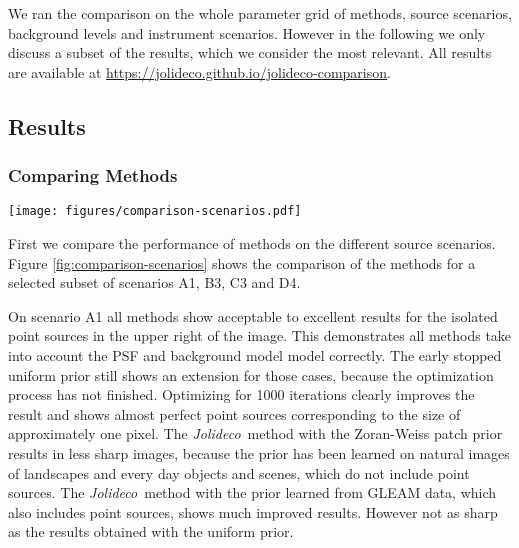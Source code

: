 \documentclass[twocolumn]{aastex631}
\newcommand{\jolideco}{\textit{Jolideco}~}
\newcommand{\todo}[1]{\textcolor{red}{TODO: #1}\PackageWarning{TODO:}{#1!}}
\begin{document}
    We ran the comparison on the whole parameter grid of methods, source scenarios, background levels and instrument scenarios. However in the following we only discuss a subset of the results, which we consider the most relevant. All results are available at \url{https://jolideco.github.io/jolideco-comparison}.

    \subsection{Results}
    \subsubsection{Comparing Methods}
    \begin{figure*}
        \begin{centering}
            \texttt{[image: figures/comparison-scenarios.pdf]}
            \caption{
                Comparison of different deconvolution methods for different selected scenarios, as described in Section~\ref{subsec:test-datasets}. The simulation of the data used a fixed background level of, a constant exposure and a Gaussian PSF of \todo{x pixels}, corresponding to the "Chandra" scenario. The left column shows the simulated counts data and the second most column from the left the underlying ground truth to compare. The other column show the reconstructed flux by the different methods and prior assumptions. The methods are described in detail in Section~\ref{subsec:methods}.
                A more detailed representation of the results is available at \url{https://jolideco.github.io/jolideco-comparison}.
            }
            \label{fig:comparison-scenarios}
        \end{centering}
    \end{figure*}
    First we compare the performance of methods on the different source scenarios.
    Figure \ref{fig:comparison-scenarios} shows the comparison of the methods for a selected subset of scenarios A1, B3, C3 and D4. 
    
    On scenario A1 all methods show acceptable to excellent results for the isolated point sources in the upper right of the image. This demonstrates all methods take into account the PSF and background model model correctly. The early stopped uniform prior still shows an extension for those cases, because the optimization process has not finished. Optimizing for 1000 iterations clearly improves the result and shows almost perfect point sources corresponding to the size of approximately one pixel. The \jolideco method with the Zoran-Weiss patch prior results in less sharp images, because the prior has been learned on natural images of landscapes and every day objects and scenes, which do not include point sources. The \jolideco method with the prior learned from GLEAM data, which also includes point sources, shows much improved results. However not as sharp as the results obtained with the uniform prior.
\end{document}
